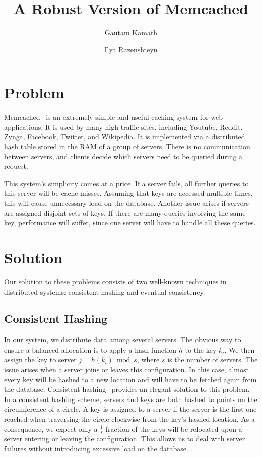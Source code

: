 \documentclass[letterpaper,11pt]{article}
\begin{document}
    \title{A Robust Version of Memcached}
    \author{Gautam Kamath \and Ilya Razenshteyn}
    \maketitle

    \section{Problem}
     Memcached~\cite{memcached} is an extremely simple and useful caching system for web applications.
     It is used by many high-traffic sites, including Youtube, Reddit, Zynga, Facebook, Twitter, and Wikipedia.
     It is implemented via a distributed hash table stored in the RAM of a group of servers.
     There is no communication between servers, and clients decide which servers need to be queried during a request.

     This system's simplicity comes at a price.
     If a server fails, all further queries to this server will be cache misses.
     Assuming that keys are accessed multiple times, this will cause unnecessary load on the database.
     Another issue arises if servers are assigned disjoint sets of keys.
     If there are many queries involving the same key, performance will suffer, since one server will have to handle all these queries.
     \section{Solution}
     Our solution to these problems consists of two well-known techniques in distributed systems: consistent hashing and eventual consistency.
     \subsection{Consistent Hashing}
     In our system, we distribute data among several servers.
     The obvious way to ensure a balanced allocation is to apply a hash function $h$ to the key $k_i$.
     We then assign the key to server $j = h(k_i) \bmod s$, where $s$ is the number of servers.
     The issue arises when a server joins or leaves this configuration.
     In this case, almost every key will be hashed to a new location and will have to be fetched again from the database.
     Consistent hashing~\cite{chashing} provides an elegant solution to this problem.
     In a consistent hashing scheme, servers and keys are both hashed to points on the circumference of a circle.
     A key is assigned to a server if the server is the first one reached when traversing the circle clockwise from the key's hashed location.
     As a consequence, we expect only a $\frac{1}{s}$ fraction of the keys will be relocated upon a server entering or leaving the configuration.
     This allows us to deal with server failures without introducing excessive load on the database.
\end{document}
